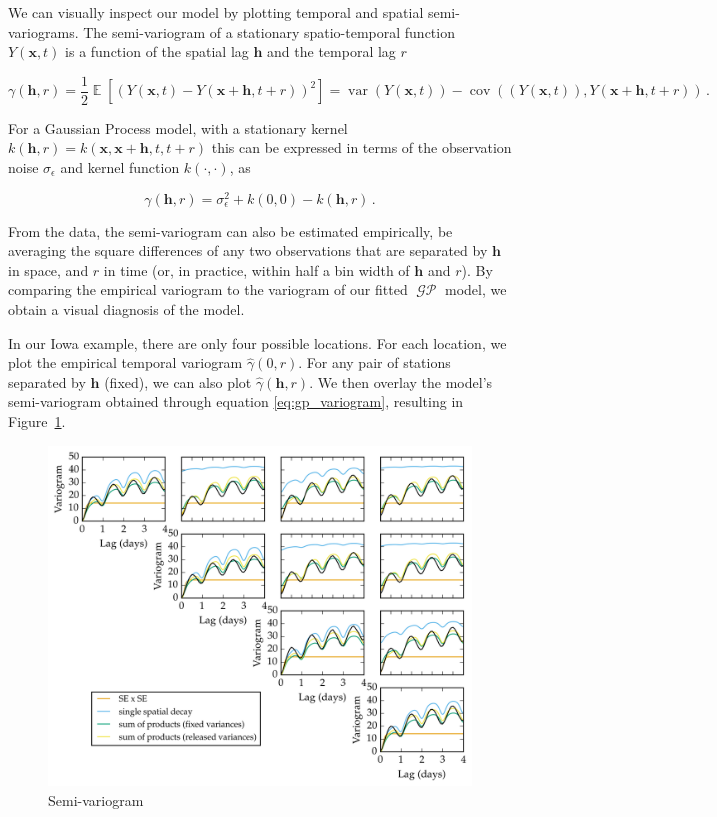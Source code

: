 \documentclass[letter]{article}
\makeatletter
\def\maxwidth{\ifdim\Gin@nat@width>\linewidth\linewidth
\else\Gin@nat@width\fi}
\let\Oldincludegraphics\includegraphics
\renewcommand{\includegraphics}[1]{\Oldincludegraphics[width=.8\maxwidth]{#1}}
\newcommand{\genericdel}[3]{%
      \left#1#3\right#2
    }
\newcommand{\del}[1]{\genericdel(){#1}}
\newcommand{\sbr}[1]{\genericdel[]{#1}}
\DeclareMathOperator{\E}{\mathbb{E}}
\DeclareMathOperator{\cov}{{cov}}
\DeclareMathOperator{\var}{{var}}
\DeclareMathOperator{\GP}{\mathcal{GP}}
\newcommand{\xvec}{\mathbold{x}}
\newcommand{\hvec}{\mathbold{h}}
\newcommand{\sigman}{\sigma_{\epsilon}}
\makeatother
\begin{document}
We can visually inspect our model by plotting temporal and spatial semi-variograms. The semi-variogram of a stationary spatio-temporal function \(Y(\xvec,t)\) is a function of the spatial lag \(\hvec\) and the temporal lag \(r\)

\begin{equation}
    \gamma\del{\hvec,r} = \frac{1}{2} \E\sbr{\del{Y\del{\xvec,t}-Y\del{\xvec+\hvec,t+r}}^2} = \var\del{ Y\del{\xvec,t}} - \cov\del{ \del{Y\del{\xvec,t}} , Y\del{\xvec+\hvec,t+r}}\,.
\end{equation}

For a Gaussian Process model, with a stationary kernel \(k(\hvec,r)=k(\xvec,\xvec+\hvec,t,t+r)\) this can be expressed in terms of the observation noise \(\sigman\) and kernel function \(k(\cdot,\cdot)\), as

\begin{equation}
    \label{eq:gp_variogram}
    \gamma\del{\hvec,r} = \sigman^2 + k\del{0,0} - k(\hvec,r)\,.
\end{equation}

From the data, the semi-variogram can also be estimated empirically, be averaging the square differences of any two observations that are separated by \(\hvec\) in space, and \(r\) in time (or, in practice, within half a bin width of \(\hvec\) and \(r\)). By comparing the empirical variogram to the variogram of our fitted \(\GP\) model, we obtain a visual diagnosis of the model.

In our Iowa example, there are only four possible locations. For each location, we plot the empirical temporal variogram \(\hat\gamma\del{0,r}\). For any pair of stations separated by \(\hvec\) (fixed), we can also plot \(\hat\gamma\del{\hvec,r}\). We then overlay the model's semi-variogram obtained through equation \eqref{eq:gp_variogram}, resulting in Figure~\ref{fig:spatial_variogram}.

\begin{figure}
\centering
\includegraphics{figures/spatial_variogram.png}
\caption{\label{fig:spatial_variogram} Semi-variogram}
\end{figure}
    
\end{document}
